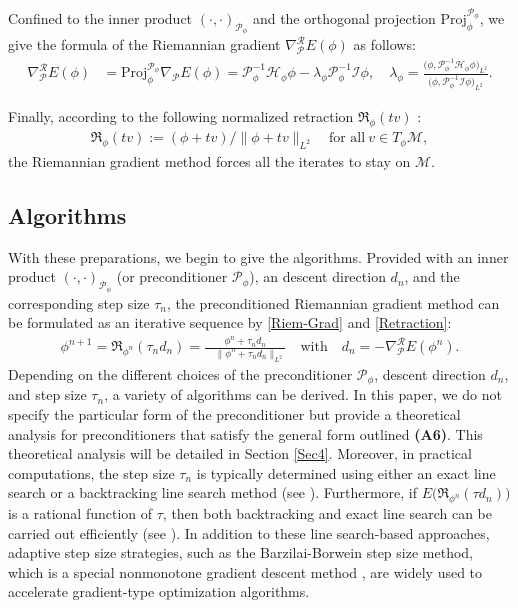 \documentclass[preprint,3p]{elsarticle}
\begin{document}
Confined to the inner product $(\cdot,\cdot)_{\mathcal{P}_{\phi}}$ and the orthogonal projection $\text{Proj}_{\phi}^{\mathcal{P}_{\phi}}$, we give the formula of the Riemannian gradient $\nabla_{\mathcal{P}}^{\mathcal{R}} E(\phi)$ as follows:
\begin{align}\label{Riem-Grad}
	\nabla_{{\mathcal{P}}}^{\mathcal{R}} E(\phi)&=\text{Proj}_{\phi}^{\mathcal{P}_{\phi}}\nabla_{\mathcal{P}}E(\phi)=\mathcal{P}_{\phi}^{-1}\mathcal{H}_{\phi}\phi-\lambda_{\phi}\mathcal{P}_{\phi}^{-1}\mathcal{I}\phi,\quad
	\lambda_{\phi}=\frac{\big(\phi,\mathcal{P}_{\phi}^{-1}\mathcal{H}_{\phi}\phi\big)_{L^2}}{\big(\phi,\mathcal{P}_{\phi}^{-1}\mathcal{I}\phi\big)_{L^2}}.
\end{align}

Finally, according to the following normalized retraction $\mathfrak{R}_{\phi}(tv)$ \cite{N.B.appear}:
\begin{align}\label{Retraction}
	\mathfrak{R}_{\phi}(tv):=(\phi+tv)/\big\|\phi+tv\big\|_{L^2}\quad\text{for all}\ v\in T_{\phi}\mathcal{M},
\end{align}
the Riemannian gradient method forces all the iterates  to stay on $\mathcal{M}$.

\subsection{Algorithms}
With these preparations, we begin to give the algorithms. Provided with an inner product $(\cdot,\cdot)_{\mathcal{P}_{\phi}}$ (or preconditioner $\mathcal{P}_{\phi}$), an descent direction $d_n$, and the corresponding step size $\tau_n$, the preconditioned Riemannian gradient method can be formulated as an iterative sequence by \eqref{Riem-Grad} and \eqref{Retraction}:
\begin{align}\label{Riem-Opt-menthod}
	\phi^{n+1}=\mathfrak{R}_{\phi^n}(\tau_n d_n)=\frac{\phi^n+\tau_n d_n}{\quad\big\|\phi^n+\tau_n d_n\big\|_{L^2}}\quad\text{with}\quad d_n=-\nabla_{\mathcal{P}}^{\mathcal{R}}E(\phi^n).
\end{align}
Depending on the different choices of the preconditioner $\mathcal{P}_{\phi}$, descent direction $d_n$, and step size $\tau_n$, a variety of algorithms can be derived. In this paper, we do not specify the particular form of the preconditioner but provide a theoretical analysis for preconditioners that satisfy the general form outlined {\bf (A6)}. This theoretical analysis will be detailed in Section \ref{Sec4}.
Moreover, in practical computations, the step size $\tau_n$ is typically determined using either an exact line search or a backtracking line search method (see \cite{2017Efficient,2006Numerical}). Furthermore, if $E\bigl(\mathfrak{R}_{\phi^n}(\tau d_n)\bigr)$ is a rational function of $\tau$, then both backtracking and exact line search can be carried out efficiently (see \cite{2024Convergence}). In addition to these line search-based approaches, adaptive step size strategies, such as the Barzilai-Borwein step size method, which is a special nonmonotone gradient descent method \cite{1988BB}, are widely used to accelerate gradient-type optimization algorithms.
\end{document}
